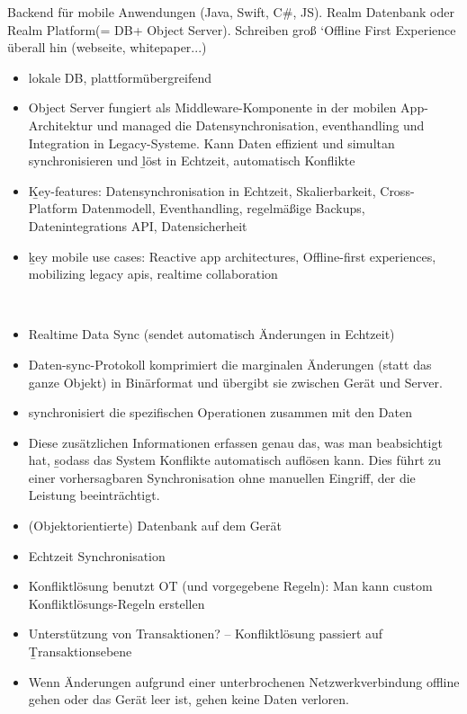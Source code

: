 Backend für mobile Anwendungen (Java, Swift, C\#, JS). Realm Datenbank oder Realm Platform(= DB+ Object Server).
Schreiben groß `Offline First Experience überall hin (webseite, whitepaper...)
\begin{itemize}
  \item lokale DB, plattformübergreifend
  \item Object Server fungiert als Middleware-Komponente in der mobilen \gls{App}-Architektur und managed die Datensynchronisation, eventhandling und Integration in Legacy-Systeme. Kann Daten effizient und simultan synchronisieren und \b{löst in Echtzeit, automatisch Konflikte}
  \item \b{Key-features:} Datensynchronisation in Echtzeit, Skalierbarkeit, Cross-Platform Datenmodell, Eventhandling, regelmäßige Backups, Datenintegrations API, Datensicherheit
  \item \b{key mobile use cases:} Reactive app architectures, Offline-first experiences, mobilizing legacy apis, realtime collaboration
\end{itemize}~\cite{realm_whitepaper}

\begin{itemize}
  \item Realtime Data Sync (sendet automatisch Änderungen in Echtzeit)
  \item Daten-sync-Protokoll komprimiert die marginalen Änderungen (statt das ganze Objekt) in Binärformat und übergibt sie zwischen Gerät und Server.
  \item synchronisiert die spezifischen Operationen zusammen mit den Daten
  \item Diese zusätzlichen Informationen erfassen genau das, was man beabsichtigt hat, \b{sodass das System Konflikte automatisch auflösen kann}. Dies führt zu einer vorhersagbaren Synchronisation ohne manuellen Eingriff, der die Leistung beeinträchtigt.
  \item (Objektorientierte) Datenbank auf dem Gerät
  \item Echtzeit Synchronisation
  \item Konfliktlösung benutzt OT (und vorgegebene Regeln): Man kann custom Konfliktlösungs-Regeln erstellen
  \item Unterstützung von Transaktionen? -- Konfliktlösung passiert auf \b{Transaktionsebene}
  \item Wenn Änderungen aufgrund einer unterbrochenen Netzwerkverbindung offline gehen oder das Gerät leer ist, gehen keine Daten verloren.
\end{itemize}~\cite{realm_offline_whitepaper}